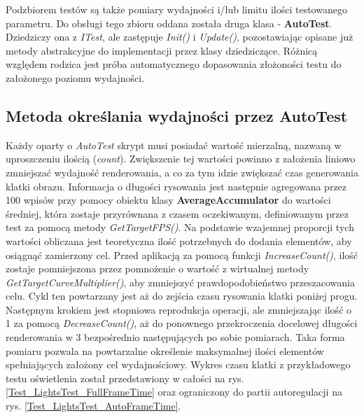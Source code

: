 	Podzbiorem testów są także pomiary wydajności i/lub limitu ilości testowanego parametru. Do obsługi tego zbioru oddana została druga klasa - \textbf{AutoTest}. Dziedziczy ona z \textit{ITest}, ale zastępuje \textit{Init()} i \textit{Update()}, pozostawiając opisane już metody abstrakcyjne do implementacji przez klasy dziedziczące. Różnicą względem rodzica jest próba automatycznego dopasowania złożoności testu do założonego poziomu wydajności. 
	
	\subsection{Metoda określania wydajności przez AutoTest}
	Każdy oparty o \textit{AutoTest} skrypt musi posiadać wartość mierzalną, nazwaną w uproszczeniu ilością (\textit{count}). Zwiększenie tej wartości powinno z założenia liniowo zmniejszać wydajność renderowania, a co za tym idzie zwiększać czas generowania klatki obrazu. Informacja o długości rysowania jest następnie agregowana przez 100 wpisów przy pomocy obiektu klasy \textbf{AverageAccumulator} do wartości średniej, która zostaje przyrównana z czasem oczekiwanym, definiowanym przez test za pomocą metody \textit{GetTargetFPS()}. Na podstawie wzajemnej proporcji tych wartości obliczana jest teoretyczna ilość potrzebnych do dodania elementów, aby osiągnąć zamierzony cel. Przed aplikacją za pomocą funkcji \textit{IncreaseCount()}, ilość zostaje pomniejszona przez pomnożenie o wartość z wirtualnej metody \textit{GetTargetCurveMultiplier()}, aby zmniejszyć prawdopodobieństwo przeszacowania celu. Cykl ten powtarzany jest aż do zejścia czasu rysowania klatki poniżej progu. Następnym krokiem jest stopniowa reprodukcja operacji, ale zmniejszając ilość o 1 za pomocą \textit{DecreaseCount()}, aż do ponownego przekroczenia docelowej długości renderowania w 3 bezpośrednio następujących po sobie pomiarach. Taka forma pomiaru pozwala na powtarzalne określenie maksymalnej ilości elementów spełniających założony cel wydajnościowy. Wykres czasu klatki z przykładowego testu oświetlenia został przedstawiony w całości na rys. \ref{Test_LightsTest_FullFrameTime} oraz ograniczony do partii autoregulacji na rys. \ref{Test_LightsTest_AutoFrameTime}.
	
